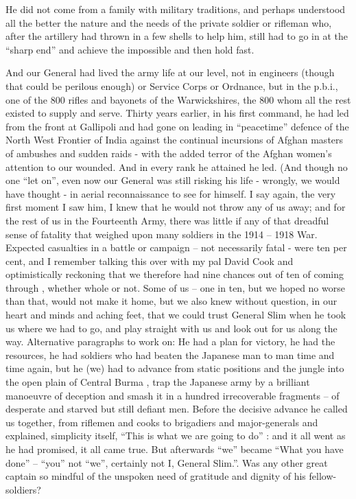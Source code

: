 He did not come from a family with military traditions, and perhaps  understood all the better the nature and the needs of the private soldier  or rifleman who, after the artillery had thrown in a few shells to help him, still had to go in at the “sharp end”  and achieve the impossible and then hold fast. 

And our General had lived the army life at our level, not in engineers (though that could be perilous enough) or Service  Corps or Ordnance, but in the p.b.i., one of the 800  rifles and bayonets of the Warwickshires, the 800 whom all the rest existed to supply and serve.   Thirty years earlier, in his first command, he had led from the front at Gallipoli and had gone on leading in “peacetime” defence of the North West Frontier of India against the continual incursions of Afghan masters of ambushes and sudden raids - with the added  terror of the Afghan women’s attention to our wounded. And in every rank he attained he led. (And  though no one “let on”, even now our General  was still risking   his life  - wrongly, we would have thought -  in aerial reconnaissance to see for himself.
  I say again,  the very first moment I saw him, I  knew  that he would not throw any of us away; and for the rest of us in the Fourteenth Army,  there was little if any  of that dreadful sense of fatality that weighed upon many soldiers  in the 1914 – 1918 War. Expected casualties in a battle or campaign – not necessarily fatal - were ten per cent, and I remember talking this over with my pal David Cook  and optimistically reckoning that we therefore had nine chances out of ten of coming through ,  whether whole or not.  Some of us – one in ten, but we hoped no worse than that, would not make it home, but we also knew without question, in our heart  and minds and aching feet, that we could trust General  Slim when he took us  where we had to go, and play straight with us and look out for us along the way.
Alternative  paragraphs to work on:
   He had a plan for victory, he had the resources, he had soldiers who had beaten the Japanese man to man time and time again,  but he (we) had to advance from static positions and the jungle into the open plain of Central Burma , trap the Japanese army by a brilliant manoeuvre of deception  and smash  it in a  hundred irrecoverable fragments – of desperate and  starved but still defiant men. Before the decisive advance  he called us together, from riflemen and cooks to brigadiers and major-generals and explained, simplicity itself, “This is what we are going to do” : and it all went as he had promised, it all came true. But afterwards “we” became “What you have done” – “you” not “we”, certainly not I, General Slim.”.   Was any other great captain so mindful of the unspoken need of gratitude and dignity of his fellow-soldiers?
